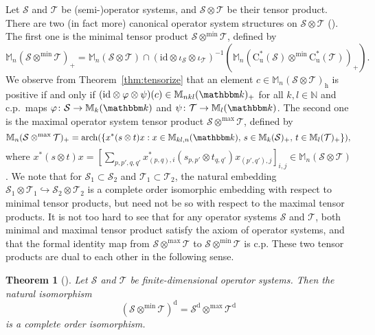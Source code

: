 \documentclass[12pt]{amsart}
\newtheorem{thm}{Theorem}
\theoremstyle{definition}
\begin{document}
Let ${{\mathcal S}}$ and ${{\mathcal T}}$ be (semi-)operator systems, and ${{\mathcal S}}\otimes{{\mathcal T}}$ be their tensor product.
There are two (in fact more) canonical operator system structures on ${{\mathcal S}}\otimes{{\mathcal T}}$ (\cite{kptt,fp}).
The first one is the minimal tensor product ${{\mathcal S}}\otimes^{\min}{{\mathcal T}}$, defined by
\[
{{\mathbb M}}_n({{\mathcal S}}\otimes^{\min}{{\mathcal T}})_+={{\mathbb M}}_n({{\mathcal S}}\otimes{{\mathcal T}})
 \cap ({\mathrm{id}}\otimes\iota_{{\mathcal S}}\otimes\iota_{{\mathcal T}})^{-1}
   ({{\mathbb M}}_n(\mathrm{C}^*_{\mathrm{u}}({{\mathcal S}})\otimes^{\min}\mathrm{C}^*_{\mathrm{u}}({{\mathcal T}}))_+).
\]
We observe from Theorem~\ref{thm:tensorize} that
an element $c\in{{\mathbb M}}_n({{\mathcal S}}\otimes{{\mathcal T}})_{\mathrm{h}}$ is positive if and only if
$({\mathrm{id}}\otimes{\varphi}\otimes\psi)(c)\in {{\mathbb M}}_{nkl}({{\mathbbm k}})_+$ for all $k,l\in{{\mathbb N}}$ and
c.p.\ maps ${\varphi}\colon {{\mathcal S}}\to{{\mathbb M}}_k({{\mathbbm k}})$ and $\psi\colon{{\mathcal T}}\to{{\mathbb M}}_l({{\mathbbm k}})$.
The second one is the maximal operator system tensor product ${{\mathcal S}}\otimes^{\max}{{\mathcal T}}$,
defined by
\[
{{\mathbb M}}_n({{\mathcal S}}\otimes^{\max}{{\mathcal T}})_+ = \operatorname*{arch}(\{x^* (s\otimes t) x :
 x\in{{\mathbb M}}_{kl,n}({{\mathbbm k}}),\, s\in{{\mathbb M}}_k({{\mathcal S}})_+,\, t\in{{\mathbb M}}_l({{\mathcal T}})_+\}),
\]
where $x^* (s\otimes t) x
=[\sum_{p,p',q,q'} x_{(p,q),i}^*(s_{p,p'}\otimes t_{q,q'})x_{(p',q'),j}]_{i,j} \in {{\mathbb M}}_n({{\mathcal S}}\otimes{{\mathcal T}})$.
We note that for ${{\mathcal S}}_1\subset{{\mathcal S}}_2$ and ${{\mathcal T}}_1\subset{{\mathcal T}}_2$, the natural
embedding ${{\mathcal S}}_1\otimes{{\mathcal T}}_1\hookrightarrow {{\mathcal S}}_2\otimes{{\mathcal T}}_2$
is a complete order isomorphic embedding with respect to minimal tensor products,
but need not be so with respect to the maximal tensor products.
It is not too hard to see that for any operator systems ${{\mathcal S}}$ and ${{\mathcal T}}$,
both minimal and maximal tensor product satisfy the axiom of operator systems,
and that the formal identity map from ${{\mathcal S}}\otimes^{\max}{{\mathcal T}}$ to ${{\mathcal S}}\otimes^{\min}{{\mathcal T}}$ is c.p.
These two tensor products are dual to each other in the following sense.
\begin{thm}[\cite{fp}]\label{thm:fp}
Let ${{\mathcal S}}$ and ${{\mathcal T}}$ be finite-dimensional operator systems.
Then the natural isomorphism
\[
({{\mathcal S}}\otimes^{\min}{{\mathcal T}})^{\mathrm{d}}={{\mathcal S}}^{\mathrm{d}}\otimes^{\max}{{\mathcal T}}^{\mathrm{d}}
\]
is a complete order isomorphism.
\end{thm}
\end{document}
